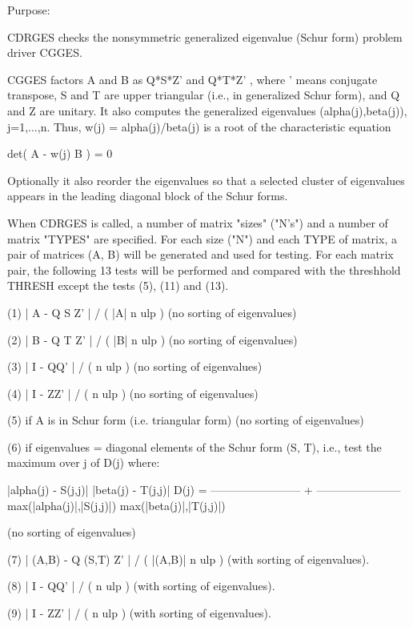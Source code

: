 \begin{DoxyParagraph}{Purpose\+: }
\begin{DoxyVerb} CDRGES checks the nonsymmetric generalized eigenvalue (Schur form)
 problem driver CGGES.

 CGGES factors A and B as Q*S*Z'  and Q*T*Z' , where ' means conjugate
 transpose, S and T are  upper triangular (i.e., in generalized Schur
 form), and Q and Z are unitary. It also computes the generalized
 eigenvalues (alpha(j),beta(j)), j=1,...,n.  Thus,
 w(j) = alpha(j)/beta(j) is a root of the characteristic equation

                 det( A - w(j) B ) = 0

 Optionally it also reorder the eigenvalues so that a selected
 cluster of eigenvalues appears in the leading diagonal block of the
 Schur forms.

 When CDRGES is called, a number of matrix "sizes" ("N's") and a
 number of matrix "TYPES" are specified.  For each size ("N")
 and each TYPE of matrix, a pair of matrices (A, B) will be generated
 and used for testing. For each matrix pair, the following 13 tests
 will be performed and compared with the threshhold THRESH except
 the tests (5), (11) and (13).


 (1)   | A - Q S Z' | / ( |A| n ulp ) (no sorting of eigenvalues)


 (2)   | B - Q T Z' | / ( |B| n ulp ) (no sorting of eigenvalues)


 (3)   | I - QQ' | / ( n ulp ) (no sorting of eigenvalues)


 (4)   | I - ZZ' | / ( n ulp ) (no sorting of eigenvalues)

 (5)   if A is in Schur form (i.e. triangular form) (no sorting of
       eigenvalues)

 (6)   if eigenvalues = diagonal elements of the Schur form (S, T),
       i.e., test the maximum over j of D(j)  where:

                     |alpha(j) - S(j,j)|        |beta(j) - T(j,j)|
           D(j) = ------------------------ + -----------------------
                  max(|alpha(j)|,|S(j,j)|)   max(|beta(j)|,|T(j,j)|)

       (no sorting of eigenvalues)

 (7)   | (A,B) - Q (S,T) Z' | / ( |(A,B)| n ulp )
       (with sorting of eigenvalues).

 (8)   | I - QQ' | / ( n ulp ) (with sorting of eigenvalues).

 (9)   | I - ZZ' | / ( n ulp ) (with sorting of eigenvalues).


\end{DoxyVerb}
\end{DoxyParagraph}
